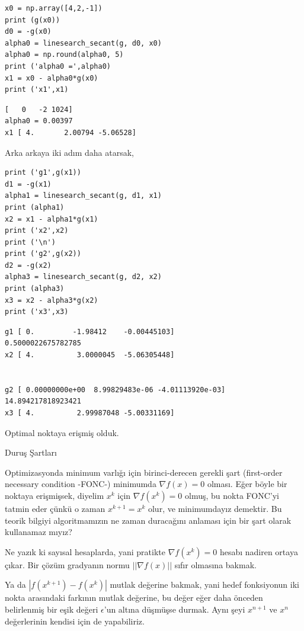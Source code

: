 \documentclass[12pt,fleqn]{article}\usepackage{../../common}
\begin{document}
\begin{verbatim}
x0 = np.array([4,2,-1])
print (g(x0))
d0 = -g(x0)
alpha0 = linesearch_secant(g, d0, x0)
alpha0 = np.round(alpha0, 5)
print ('alpha0 =',alpha0)
x1 = x0 - alpha0*g(x0)
print ('x1',x1)
\end{verbatim}

\begin{verbatim}
[   0   -2 1024]
alpha0 = 0.00397
x1 [ 4.       2.00794 -5.06528]
\end{verbatim}

Arka arkaya iki adım daha atarsak,

\begin{verbatim}
print ('g1',g(x1))
d1 = -g(x1)
alpha1 = linesearch_secant(g, d1, x1)
print (alpha1)
x2 = x1 - alpha1*g(x1)
print ('x2',x2)
print ('\n')
print ('g2',g(x2))
d2 = -g(x2)
alpha3 = linesearch_secant(g, d2, x2)
print (alpha3)
x3 = x2 - alpha3*g(x2)
print ('x3',x3)
\end{verbatim}

\begin{verbatim}
g1 [ 0.         -1.98412    -0.00445103]
0.5000022675782785
x2 [ 4.          3.0000045  -5.06305448]


g2 [ 0.00000000e+00  8.99829483e-06 -4.01113920e-03]
14.894217818923421
x3 [ 4.          2.99987048 -5.00331169]
\end{verbatim}

Optimal noktaya erişmiş olduk.

Duruş Şartları 

Optimizasyonda minimum varlığı için birinci-derecen gerekli şart
(first-order necessary condition -FONC-) minimumda $\nabla f(x) = 0$
olması. Eğer böyle bir noktaya erişmişsek, diyelim $x^k$ için
$\nabla f(x^k) = 0$ olmuş, bu nokta FONC'yi tatmin eder çünkü o zaman
$x^{k+1} = x^k$ olur, ve minimumdayız demektir. Bu teorik bilgiyi
algoritmamızın ne zaman duracağını anlaması için bir şart olarak kullanamaz
mıyız?

Ne yazık ki sayısal hesaplarda, yani pratikte $\nabla f(x^k) = 0$ hesabı
nadiren ortaya çıkar. Bir çözüm gradyanın normu $|| \nabla f(x) ||$ sıfır
olmasına bakmak. 

Ya da $| f(x^{k+1}) - f(x^k) |$ mutlak değerine bakmak, yani hedef
fonksiyonun iki nokta arasındaki farkının mutlak değerine, bu değer eğer
daha önceden belirlenmiş bir eşik değeri $\epsilon$'un altına düşmüşse
durmak. Aynı şeyi $x^{n+1}$ ve $x^n$ değerlerinin kendisi için de
yapabiliriz.
\end{document}
